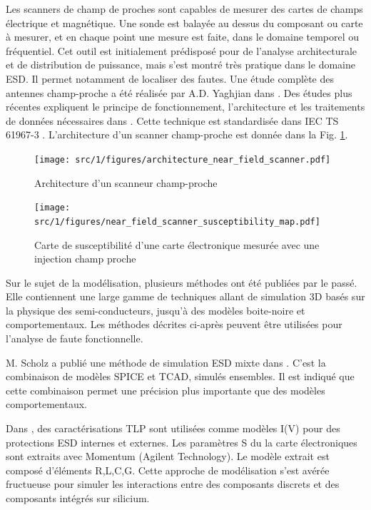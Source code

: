 Les scanners de champ de proches sont capables de mesurer des cartes de champs électrique et magnétique.
Une sonde est balayée au dessus du composant ou carte à mesurer, et en chaque point une mesure est faite, dans le domaine temporel ou fréquentiel.
Cet outil est initialement prédisposé pour de l'analyse architecturale et de distribution de puissance, mais s'est montré très pratique dans le domaine ESD.
Il permet notamment de localiser des fautes.
Une étude complète des antennes champ-proche a été réalisée par A.D. Yaghjian dans \cite{nfsFirstStudy}.
Des études plus récentes expliquent le principe de fonctionnement, l'architecture et les traitements de données nécessaires dans \cite{near-field-scan, planarNFSAntenna, NFSMeasurements, NFScanner}.
Cette technique est standardisée dans IEC TS 61967-3 \cite{iec61967}.
L'architecture d'un scanner champ-proche est donnée dans la Fig. \ref{fig:near-field-scanner}.

\begin{figure}[!h]
  \centering
  \texttt{[image: src/1/figures/architecture\_near\_field\_scanner.pdf]}
  \caption{Architecture d'un scanneur champ-proche}
  \label{fig:near-field-scanner}
\end{figure}

\begin{figure}[!h]
  \centering
  \texttt{[image: src/1/figures/near\_field\_scanner\_susceptibility\_map.pdf]}
  \caption{Carte de susceptibilité d'une carte électronique mesurée avec une injection champ proche \cite{}}
  \label{fig:near-field-scan-map}
\end{figure}

Sur le sujet de la modélisation, plusieurs méthodes ont été publiées par le passé.
Elle contiennent une large gamme de techniques allant de simulation 3D basés sur la physique des semi-conducteurs, jusqu'à des modèles boite-noire et comportementaux.
Les méthodes décrites ci-après peuvent être utilisées pour l'analyse de faute fonctionnelle.

M. Scholz a publié une méthode de simulation ESD mixte dans \cite{mixedModeESDSims}.
C'est la combinaison de modèles SPICE et TCAD, simulés ensembles.
Il est indiqué que cette combinaison permet une précision plus importante que des modèles comportementaux.

Dans \cite{usb2ESDProtection}, des caractérisations TLP sont utilisées comme modèles I(V) pour des protections ESD internes et externes.
Les paramètres S du la carte électroniques sont extraits avec Momentum (Agilent Technology).
Le modèle extrait est composé d'éléments R,L,C,G.
Cette approche de modélisation s'est avérée fructueuse pour simuler les interactions entre des composants discrets et des composants intégrés sur silicium.

